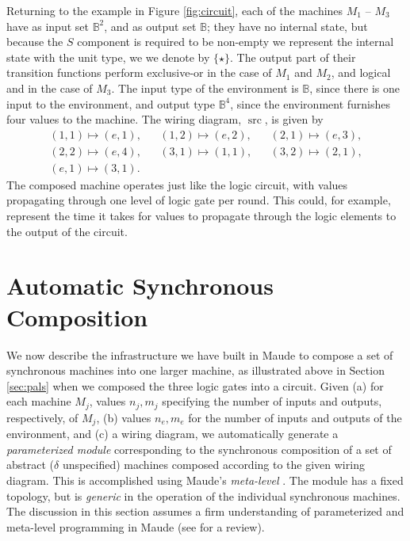 \documentclass[copyright,creativecommons]{eptcs}
\DeclareMathOperator{\src}{src}
\begin{document}
Returning to the example in Figure \ref{fig:circuit}, each of the machines
$M_1$ -- $M_3$ have as input set $\mathbb{B}^2$, and as output set $\mathbb{B}$;
they have no internal state, but because the $S$ component is required to be
non-empty we represent the internal state with the unit type, we we denote by $\{\star\}$.
The output part of their transition functions perform exclusive-or in the case
of $M_1$ and $M_2$, and logical and in the case of $M_3$. The input type of the
environment is $\mathbb{B}$, since there is one input to the environment, and
output type $\mathbb{B}^4$, since the environment furnishes four values to the
machine. The wiring diagram, $\src$, is given by
\begin{align*}
(1,1) \mapsto (e,1), && (1,2) \mapsto (e,2), && (2,1) \mapsto (e,3), \\ 
(2,2) \mapsto (e,4), && (3,1) \mapsto (1,1), && (3,2) \mapsto (2,1), \\
(e,1) \mapsto (3,1).
\end{align*}
The composed machine operates just like the logic circuit, with values
propagating through one level of logic gate per round. This could, for example,
represent the time it takes for values to propagate through the logic
elements to the output of the circuit.

\section{Automatic Synchronous Composition}
\label{sec:sc}

We now describe the infrastructure we have built in Maude to compose a set of
synchronous machines into one larger machine, as illustrated above in Section
\ref{sec:pals} when we composed the three logic gates into a circuit. Given (a)
for each machine $M_j$, values $n_j,m_j$ specifying the number of inputs and
outputs, respectively, of $M_j$, (b) values $n_e,m_e$ for the number of inputs
and outputs of the environment, and (c) a wiring diagram, we automatically
generate a \emph{parameterized module} \cite[Ch. 10]{clavel_2007_01}
corresponding to the synchronous composition of a set of abstract ($\delta$
unspecified) machines composed according to the given wiring diagram. This is
accomplished using Maude's \emph{meta-level} \cite[Ch. 14]{clavel_2007_01}. The
module has a fixed topology, but is \emph{generic} in the operation of the
individual synchronous machines. The discussion in this section assumes a firm
understanding of parameterized and meta-level programming in Maude (see
\cite{clavel_2007_01} for a review).
\end{document}
